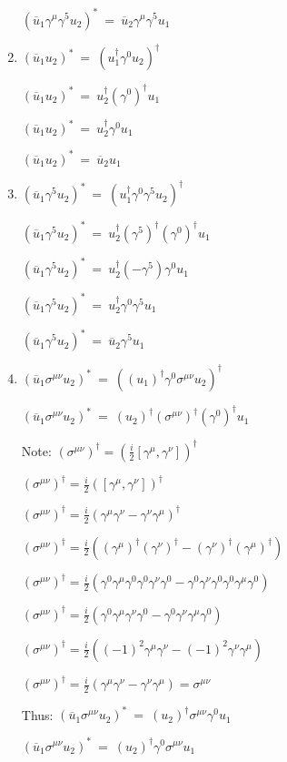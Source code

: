 \documentclass[12pt]{article}
\def \ga{\gamma}
\def \si{\sigma}
\begin{document}
\begin{enumerate}
 $(\overline{u}_1 \ga^\mu \ga^5 u_2)^* ~=~ \overline{u}_2 \ga^\mu \ga^5 u_1$

\item $ (\overline{u}_1 u_2)^* ~=~ (u_1^\dag \ga^0 u_2)^\dag$

$ (\overline{u}_1 u_2)^* ~=~ u_2^\dag (\ga^0)^\dag u_1$

$ (\overline{u}_1 u_2)^* ~=~u_2^\dag \ga^0 u_1$

$ (\overline{u}_1 u_2)^* ~=~ \overline{u}_2 u_1$

\item$ (\overline{u}_1 \ga^5 u_2)^* ~=~ (u_1^\dag \ga^0 \ga^5 u_2)^\dag$

$(\overline{u}_1 \ga^5 u_2)^* ~=~ u_2^\dag (\ga^5)^\dag (\ga^0)^\dag u_1$

$(\overline{u}_1 \ga^5 u_2)^* ~=~ u_2^\dag (-\ga^5) \ga^0 u_1$

$(\overline{u}_1 \ga^5 u_2)^* ~=~ u_2^\dag \ga^0 \ga^5 u_1$

$(\overline{u}_1 \ga^5 u_2)^* ~=~ \overline{u}_2 \ga^5 u_1$

\item $(\overline{u}_1 \si^{\mu\nu} u_2)^* ~=~((u_1)^\dag \ga^0 \si^{\mu\nu} u_2)^\dag $

$(\overline{u}_1 \si^{\mu\nu} u_2)^* ~=~(u_2)^\dag (\si^{\mu\nu})^\dag (\ga^0)^\dag u_1 $

Note: $(\si^{\mu\nu})^\dag = (\frac{i}{2}[\ga^\mu,\ga^\nu])^\dag$

$(\si^{\mu\nu})^\dag = \frac{i}{2}([\ga^\mu,\ga^\nu])^\dag$

$(\si^{\mu\nu})^\dag = \frac{i}{2}(\ga^\mu\ga^\nu-\ga^\nu\ga^\mu)^\dag$

$(\si^{\mu\nu})^\dag = \frac{i}{2}((\ga^\mu)^\dag(\ga^\nu)^\dag-(\ga^\nu)^\dag(\ga^\mu)^\dag)$

$(\si^{\mu\nu})^\dag = \frac{i}{2}(\ga^0\ga^\mu\ga^0\ga^0\ga^\nu\ga^0-\ga^0\ga^\nu\ga^0\ga^0\ga^\mu\ga^0)$

$(\si^{\mu\nu})^\dag = \frac{i}{2}(\ga^0\ga^\mu\ga^\nu\ga^0-\ga^0\ga^\nu \ga^\mu\ga^0)$

$(\si^{\mu\nu})^\dag = \frac{i}{2}((-1)^2\ga^\mu\ga^\nu-(-1)^2\ga^\nu \ga^\mu)$

$(\si^{\mu\nu})^\dag = \frac{i}{2}(\ga^\mu\ga^\nu-\ga^\nu \ga^\mu)= \si^{\mu\nu}$

Thus:
$(\overline{u}_1 \si^{\mu\nu} u_2)^* ~=~(u_2)^\dag \si^{\mu\nu} \ga^0 u_1 $

$(\overline{u}_1 \si^{\mu\nu} u_2)^* ~=~(u_2)^\dag \ga^0 \si^{\mu\nu} u_1 $


\end{enumerate}
\end{document}
